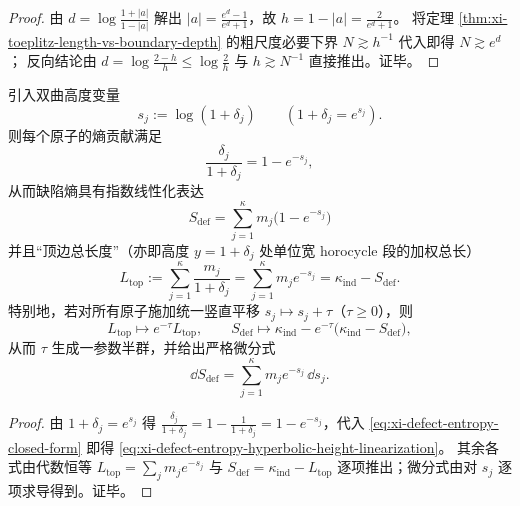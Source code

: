 \begin{proof}
由 \(d=\log\frac{1+|a|}{1-|a|}\) 解出
\(
|a|=\frac{e^{d}-1}{e^{d}+1}
\)，故
\(
h=1-|a|=\frac{2}{e^{d}+1}
\)。
将定理 \ref{thm:xi-toeplitz-length-vs-boundary-depth} 的粗尺度必要下界 \(N\gtrsim h^{-1}\) 代入即得 \(N\gtrsim e^{d}\)；
反向结论由 \(d=\log\frac{2-h}{h}\le \log\frac{2}{h}\) 与 \(h\gtrsim N^{-1}\) 直接推出。证毕。
\end{proof}

\begin{proposition}\label{prop:xi-defect-entropy-hyperbolic-height-semigroup}
引入双曲高度变量
\[
s_j:=\log(1+\delta_j)\qquad(1+\delta_j=e^{s_j}).
\]
则每个原子的熵贡献满足
\[
\frac{\delta_j}{1+\delta_j}=1-e^{-s_j},
\]
从而缺陷熵具有指数线性化表达
\begin{equation}\label{eq:xi-defect-entropy-hyperbolic-height-linearization}
\boxed{\;
S_{\mathrm{def}}=\sum_{j=1}^{\kappa}m_j\bigl(1-e^{-s_j}\bigr)\;}
\end{equation}
并且“顶边总长度”（亦即高度 \(y=1+\delta_j\) 处单位宽 horocycle 段的加权总长）
\[
L_{\mathrm{top}}
:=\sum_{j=1}^{\kappa}\frac{m_j}{1+\delta_j}
=\sum_{j=1}^{\kappa}m_j e^{-s_j}
=\kappa_{\mathrm{ind}}-S_{\mathrm{def}}.
\]
特别地，若对所有原子施加统一竖直平移 \(s_j\mapsto s_j+\tau\)（\(\tau\ge 0\)），则
\[
L_{\mathrm{top}}\mapsto e^{-\tau}L_{\mathrm{top}},
\qquad
S_{\mathrm{def}}\mapsto \kappa_{\mathrm{ind}}-e^{-\tau}\bigl(\kappa_{\mathrm{ind}}-S_{\mathrm{def}}\bigr),
\]
从而 \(\tau\) 生成一参数半群，并给出严格微分式
\[
\dd S_{\mathrm{def}}=\sum_{j=1}^{\kappa} m_j e^{-s_j}\,\dd s_j.
\]
\end{proposition}

\begin{proof}
由 \(1+\delta_j=e^{s_j}\) 得
\(
\frac{\delta_j}{1+\delta_j}=1-\frac{1}{1+\delta_j}=1-e^{-s_j}
\)，代入 \eqref{eq:xi-defect-entropy-closed-form} 即得 \eqref{eq:xi-defect-entropy-hyperbolic-height-linearization}。
其余各式由代数恒等
\(
L_{\mathrm{top}}=\sum_j m_j e^{-s_j}
\)
与
\(
S_{\mathrm{def}}=\kappa_{\mathrm{ind}}-L_{\mathrm{top}}
\)
逐项推出；微分式由对 \(s_j\) 逐项求导得到。证毕。
\end{proof}

